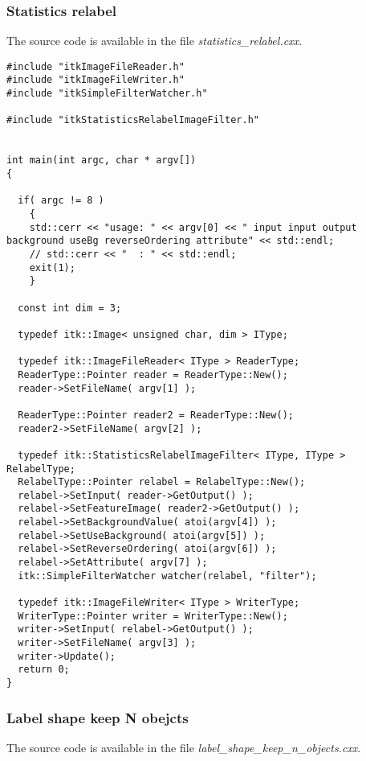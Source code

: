 \documentclass{InsightArticle}
\begin{document}
\subsubsection{Statistics relabel}

The source code is available in the file {\em statistics\_relabel.cxx}.

\small \begin{verbatim}
#include "itkImageFileReader.h"
#include "itkImageFileWriter.h"
#include "itkSimpleFilterWatcher.h"

#include "itkStatisticsRelabelImageFilter.h"


int main(int argc, char * argv[])
{

  if( argc != 8 )
    {
    std::cerr << "usage: " << argv[0] << " input input output background useBg reverseOrdering attribute" << std::endl;
    // std::cerr << "  : " << std::endl;
    exit(1);
    }

  const int dim = 3;

  typedef itk::Image< unsigned char, dim > IType;

  typedef itk::ImageFileReader< IType > ReaderType;
  ReaderType::Pointer reader = ReaderType::New();
  reader->SetFileName( argv[1] );

  ReaderType::Pointer reader2 = ReaderType::New();
  reader2->SetFileName( argv[2] );

  typedef itk::StatisticsRelabelImageFilter< IType, IType > RelabelType;
  RelabelType::Pointer relabel = RelabelType::New();
  relabel->SetInput( reader->GetOutput() );
  relabel->SetFeatureImage( reader2->GetOutput() );
  relabel->SetBackgroundValue( atoi(argv[4]) );
  relabel->SetUseBackground( atoi(argv[5]) );
  relabel->SetReverseOrdering( atoi(argv[6]) );
  relabel->SetAttribute( argv[7] );
  itk::SimpleFilterWatcher watcher(relabel, "filter");

  typedef itk::ImageFileWriter< IType > WriterType;
  WriterType::Pointer writer = WriterType::New();
  writer->SetInput( relabel->GetOutput() );
  writer->SetFileName( argv[3] );
  writer->Update();
  return 0;
}
\end{verbatim} \normalsize


\subsubsection{Label shape keep N obejcts}

The source code is available in the file {\em label\_shape\_keep\_n\_objects.cxx}.
\end{document}
